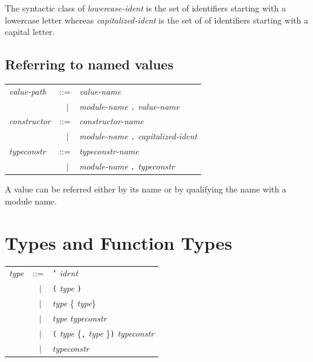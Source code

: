 \documentclass[11pt,titlepage,twoside]{report}
\newcommand{\alt}{\;|\;}
\newcommand{\term}[1]{{\tt #1}}
\newcommand{\nterm}[1]{{\em #1}}
\begin{document}
The syntactic class of \nterm{lowercase-ident} is the
set of identifiers starting with a lowercase letter whereas
\nterm{capitalized-ident} is the set of of identifiers starting with a
capital letter.

\subsection{Referring to named values\label{refnamedvalues}} %

\begin{center}
\begin{tabular}{lcl}
\nterm{value-path}  & ::=        & \nterm{value-name} \\
                    & $\;\;\alt$ & \nterm{module-name} \term{.}
                                   \nterm{value-name} \\
\nterm{constructor} & ::=        & \nterm{constructor-name} \\
                    & $\;\;\alt$ & \nterm{module-name} \term{.}
                                   \nterm{capitalized-ident} \\
\nterm{typeconstr}  & ::=        & \nterm{typeconstr-name} \\
                    & $\;\;\alt$ & \nterm{module-name} \term{.} 
                                   \nterm{typeconstr}
\end{tabular}
\end{center}
A value can be referred either by its name or by qualifying the name
with a module name.

\section{Types and Function Types\label{typesftypes}} %

\begin{center}
\begin{tabular}{lcl}
\nterm{type} & ::=        & \term{'} \nterm{ident} \\
             & $\;\;\alt$ & \term{(} \nterm{type} \term{)} \\
             & $\;\;\alt$ & \nterm{type} \{\term{*} \nterm{type}\} \\
             & $\;\;\alt$ & \nterm{type} \nterm{typeconstr} \\
             & $\;\;\alt$ & \term{(} \nterm{type} \{\term{,}
                            \nterm{type} \}\term{)} \nterm{typeconstr} \\
             & $\;\;\alt$ & \nterm{typeconstr}
\end{tabular}
\end{center}
\end{document}

